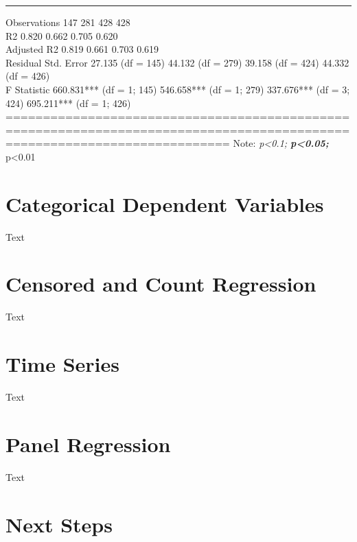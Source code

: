 \documentclass[
  letterpaper,
]{book}
\begin{document}
\begin{center}\rule{0.5\linewidth}{0.5pt}\end{center}

Observations 147 281 428 428\\
R2 0.820 0.662 0.705 0.620\\
Adjusted R2 0.819 0.661 0.703 0.619\\
Residual Std. Error 27.135 (df = 145) 44.132 (df = 279) 39.158 (df =
424) 44.332 (df = 426)\\
F Statistic 660.831*** (df = 1; 145) 546.658*** (df = 1; 279) 337.676***
(df = 3; 424) 695.211*** (df = 1; 426)
==========================================================================================================================
Note: \emph{p\textless0.1; \textbf{p\textless0.05; }}p\textless0.01


\chapter{Categorical Dependent Variables}\label{sec-categoricalDV}

Text


\chapter{Censored and Count Regression}\label{sec-censoredcount}

Text


\chapter{Time Series}\label{sec-timeseries}

Text


\chapter{Panel Regression}\label{sec-panelreg}

Text


\chapter{Next Steps}\label{sec-nextsteps}
\end{document}
